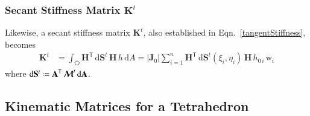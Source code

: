 \subsubsection{Secant Stiffness Matrix $\mathbf{K}^t$}

Likewise, a secant stiffness matrix $\mathbf{K}^t$, also established in Eqn.~\eqref{tangentStiffness}, becomes 
\begin{equation}
	\begin{aligned}
		\mathbf{K}^t & = \int_{\pentagon} \mathbf{H}^{\mathsf{T}} \,  \mathrm{d} \mathbf{S}^t \, \mathbf{H}  \, h \,  \mathrm{d} A
		= | \mathbf{J}_0 | \sum_{i=1}^{n}  \mathbf{H}^{\mathsf{T}} \,  \mathrm{d} \mathbf{S}^t (\xi_i, \eta_i) \, \mathbf{H} \, h_{0\,i} \, \mathrm{w}_i
	\end{aligned}
\end{equation}
where $\mathrm{d} \mathbf{S}^t \defeq \mathbf{A}^{\mathsf{T}} \, \boldsymbol{\mathcal{M}}^t \, \mathrm{d} \mathbf{A}$.

\subsection{Kinematic Matrices for a Tetrahedron}

